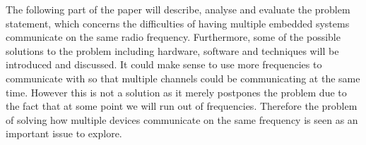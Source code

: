 \bigskip
The following part of the paper will describe, analyse and evaluate the problem statement, which concerns the difficulties of having multiple embedded systems communicate on the same radio frequency.
Furthermore, some of the possible solutions to the problem including hardware, software and techniques will be introduced and discussed.
It could make sense to use more frequencies to communicate with so that multiple channels could be communicating at the same time.
However this is not a solution as it merely postpones the problem due to the fact that at some point we will run out of frequencies. 
Therefore the problem of solving how multiple devices communicate on the same frequency is seen as an important issue to explore.